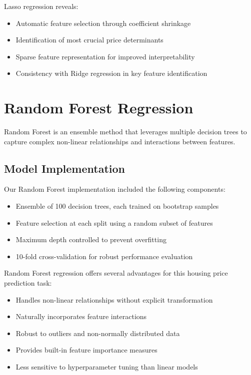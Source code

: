 Lasso regression reveals:
\begin{itemize}
    \item Automatic feature selection through coefficient shrinkage
    \item Identification of most crucial price determinants
    \item Sparse feature representation for improved interpretability
    \item Consistency with Ridge regression in key feature identification
\end{itemize}

\section{Random Forest Regression}
Random Forest is an ensemble method that leverages multiple decision trees to capture complex non-linear relationships and interactions between features.

\subsection{Model Implementation}
Our Random Forest implementation included the following components:
\begin{itemize}
    \item Ensemble of 100 decision trees, each trained on bootstrap samples
    \item Feature selection at each split using a random subset of features
    \item Maximum depth controlled to prevent overfitting
    \item 10-fold cross-validation for robust performance evaluation
\end{itemize}

Random Forest regression offers several advantages for this housing price prediction task:
\begin{itemize}
    \item Handles non-linear relationships without explicit transformation
    \item Naturally incorporates feature interactions
    \item Robust to outliers and non-normally distributed data
    \item Provides built-in feature importance measures
    \item Less sensitive to hyperparameter tuning than linear models
\end{itemize}


